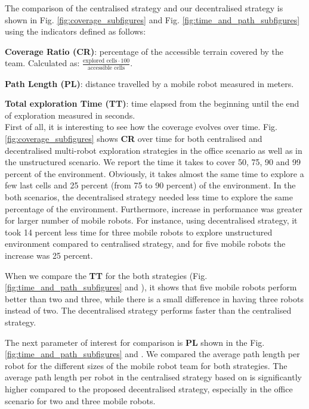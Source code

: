The comparison of the centralised strategy and our decentralised strategy is shown in Fig. \ref{fig:coverage_subfigures} and Fig. \ref{fig:time_and_path_subfigures} using the indicators defined as follows:

\textbf{Coverage Ratio (CR)}: percentage of the accessible terrain covered by the team. Calculated as:  \( \frac{\text{explored cells} \cdot 100}{\text{accessible cells}} \).

\textbf{Path Length (PL)}: distance travelled by a mobile robot measured in meters.

\textbf{Total exploration Time (TT)}: time elapsed from the beginning until the end of exploration measured in seconds.\\

First of all, it is interesting to see how the coverage evolves over time. Fig. \ref{fig:coverage_subfigures} shows \textbf{CR} over time for both centralised and decentralised multi-robot exploration strategies in the office scenario as well as in the unstructured scenario. We report the time it takes to cover 50, 75, 90 and 99 percent of the environment. Obviously, it takes almost the same time to explore a few last cells and 25 percent (from 75 to 90 percent) of the environment. In the both scenarios, the decentralised strategy needed less time to explore the same percentage of the environment. Furthermore, increase in performance was greater for larger number of mobile robots. For instance, using decentralised strategy, it took 14 percent less time for three mobile robots to explore unstructured environment compared to centralised strategy, and for five mobile robots the increase was 25 percent.  

When we compare the \textbf{TT} for the both strategies (Fig. \ref{fig:time_and_path_subfigures}  and ), it shows that five mobile robots perform better than two and three, while there is a small difference in having three robots instead of two. The decentralised strategy performs faster than the centralised strategy.

The next parameter of interest for comparison is \textbf{PL} shown in the Fig. \ref{fig:time_and_path_subfigures}  and . We compared the average path length per robot for the different sizes of the mobile robot team for both strategies. The average path length per robot in the centralised strategy based on \cite{Burgard2005} is significantly higher compared to the proposed decentralised strategy, especially in the office scenario for two and three mobile robots. 
